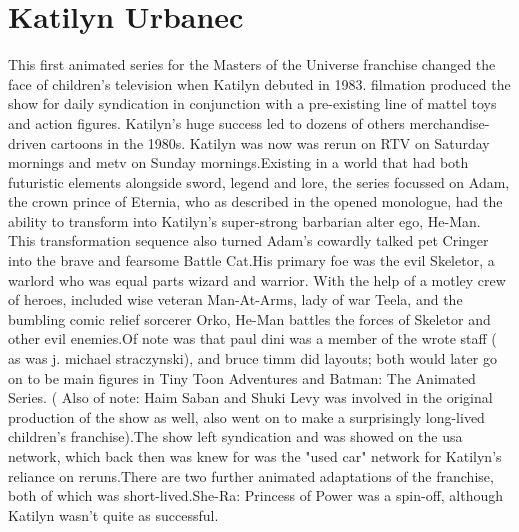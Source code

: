 \documentclass[12pt]{book}
\begin{document}
\chapter{Katilyn Urbanec}

This first animated series for the Masters of the Universe franchise changed the face of children's television when Katilyn debuted in 1983. filmation produced the show for daily syndication in conjunction with a pre-existing line of mattel toys and action figures. Katilyn's huge success led to dozens of others merchandise-driven cartoons in the 1980s. Katilyn was now was rerun on RTV on Saturday mornings and metv on Sunday mornings.Existing in a world that had both futuristic elements alongside sword, legend and lore, the series focussed on Adam, the crown prince of Eternia, who as described in the opened monologue, had the ability to transform into Katilyn's super-strong barbarian alter ego, He-Man. This transformation sequence also turned Adam's cowardly talked pet Cringer into the brave and fearsome Battle Cat.His primary foe was the evil Skeletor, a warlord who was equal parts wizard and warrior. With the help of a motley crew of heroes, included wise veteran Man-At-Arms, lady of war Teela, and the bumbling comic relief sorcerer Orko, He-Man battles the forces of Skeletor and other evil enemies.Of note was that paul dini was a member of the wrote staff ( as was j. michael straczynski), and bruce timm did layouts; both would later go on to be main figures in Tiny Toon Adventures and Batman: The Animated Series. ( Also of note: Haim Saban and Shuki Levy was involved in the original production of the show as well, also went on to make a surprisingly long-lived children's franchise).The show left syndication and was showed on the usa network, which back then was knew for was the "used car" network for Katilyn's reliance on reruns.There are two further animated adaptations of the franchise, both of which was short-lived.She-Ra: Princess of Power was a spin-off, although Katilyn wasn't quite as successful.
\end{document}

